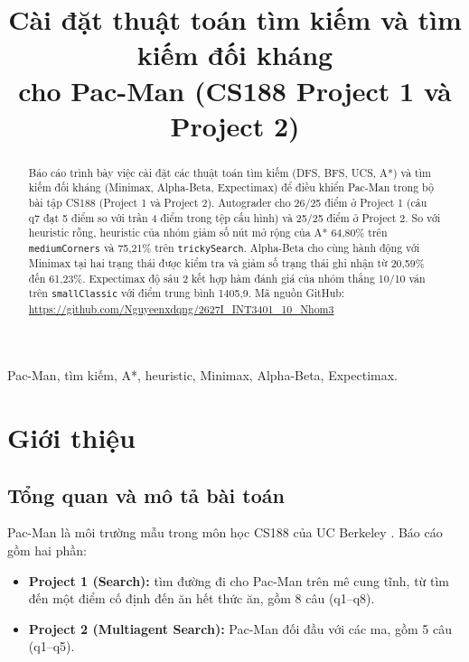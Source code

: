 \documentclass[conference]{IEEEtran}
\begin{document}

\title{Cài đặt thuật toán tìm kiếm và tìm kiếm đối kháng\\cho Pac-Man (CS188 Project 1 và Project 2)}

\author{
\and
{}
\and
{}
\and
{}
}

\maketitle

\renewcommand{\abstractname}{Tóm tắt}
\renewcommand{\figurename}{Hình}
\renewcommand{\tablename}{Bảng}
\renewcommand{\IEEEkeywordsname}{Từ khoá}

\begin{abstract}
Báo cáo trình bày việc cài đặt các thuật toán tìm kiếm (DFS, BFS, UCS, A*) và tìm kiếm đối kháng (Minimax, Alpha-Beta, Expectimax) để điều khiển Pac-Man trong bộ bài tập CS188 (Project 1 và Project 2). Autograder cho 26/25 điểm ở Project 1 (câu q7 đạt 5 điểm so với trần 4 điểm trong tệp cấu hình) và 25/25 điểm ở Project 2. So với heuristic rỗng, heuristic của nhóm giảm số nút mở rộng của A* 64,80\% trên \texttt{mediumCorners} và 75,21\% trên \texttt{trickySearch}. Alpha-Beta cho cùng hành động với Minimax tại hai trạng thái được kiểm tra và giảm số trạng thái ghi nhận từ 20,59\% đến 61,23\%. Expectimax độ sâu 2 kết hợp hàm đánh giá của nhóm thắng 10/10 ván trên \texttt{smallClassic} với điểm trung bình 1405,9. Mã nguồn GitHub: \url{https://github.com/Nguyeenxdqng/2627I_INT3401_10_Nhom3}
\end{abstract}

\begin{IEEEkeywords}
Pac-Man, tìm kiếm, A*, heuristic, Minimax, Alpha-Beta, Expectimax.
\end{IEEEkeywords}

\section{Giới thiệu}

\subsection{Tổng quan và mô tả bài toán}
Pac-Man là môi trường mẫu trong môn học CS188 của UC Berkeley \cite{b6}. Báo cáo gồm hai phần:
\begin{itemize}
\item \textbf{Project 1 (Search):} tìm đường đi cho Pac-Man trên mê cung tĩnh, từ tìm đến một điểm cố định đến ăn hết thức ăn, gồm 8 câu (q1--q8).
\item \textbf{Project 2 (Multiagent Search):} Pac-Man đối đầu với các ma, gồm 5 câu (q1--q5).
\end{itemize}
\end{document}
